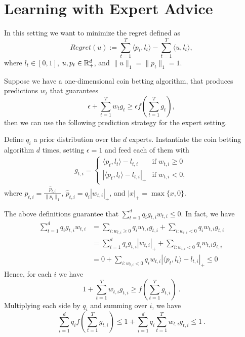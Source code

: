\section{Learning with Expert Advice}

In this setting we want to minimize the regret defined as
\[
Regret(u):=\sum_{t=1}^T \langle p_t, l_t \rangle - \sum_{t=1}^T \langle u, l_t \rangle,
\]
where $l_t \in [0,1]$, $u, p_t \in \mathbb{R}^d_+$, and $\|u\|_1=\|p_t\|_1=1$.

Suppose we have a one-dimensional coin betting algorithm, that produces predictions $w_t$ that guarantees
\[
\epsilon + \sum_{t=1}^T w_t g_t \geq \epsilon f(\sum_{t=1}^T g_t),
\]
then we can use the following prediction strategy for the expert setting.

Define $q_i$ a prior distribution over the $d$ experts.
Instantiate the coin betting algorithm $d$ times, setting $\epsilon =1$ and feed each of them with
\begin{align}
g_{t,i} = \begin{cases}
\langle p_t, l_t\rangle - l_{t,i} & \text{if } w_{t,i} \geq 0 \\
|\langle p_t, l_t\rangle - l_{t,i}|_+ & \text{if } w_{t,i} < 0,
\end{cases}
\end{align}
where $p_{t,i} = \frac{\hat{p}_{t,i}}{\|p_{t}\|_1}$, $\hat{p}_{t,i}=q_i |w_{t,i}|_+$, and $|x|_+=\max\{x,0\}$.

The above definitions guarantee that $\sum_{t=1}^d q_i g_{t,i} w_{t,i} \leq 0$. In fact, we have
\begin{align*}
\sum_{t=1}^d q_i g_{t,i} w_{t,i}
&= \sum_{i:w_{t,i}\geq0} q_i w_{t,i} g_{t,i} + \sum_{i:w_{t,i}<0} q_i w_{t,i} g_{t,i} \\
&= \sum_{i=1}^d q_i g_{t,i} |w_{t,i}|_+ + \sum_{i:w_{t,i}<0} q_i w_{t,i} g_{t,i} \\
&= 0 + \sum_{i:w_{t,i}<0} q_i w_{t,i} |\langle p_t, l_t\rangle - l_{t,i}|_+ \leq 0
\end{align*}
Hence, for each $i$ we have
\[
1+\sum_{t=1}^T w_{t,i} g_{t,i} \geq f(\sum_{t=1}^T g_{t,i})~.
\]
Multiplying each side by $q_i$ and summing over $i$, we have
\begin{equation}
\label{eq:bounded_potential}
\sum_{i=1}^d q_i f(\sum_{t=1}^T g_{t,i}) \leq 1 + \sum_{i=1}^d q_i \sum_{t=1}^T w_{t,i} g_{t,i} \leq 1~.
\end{equation}

